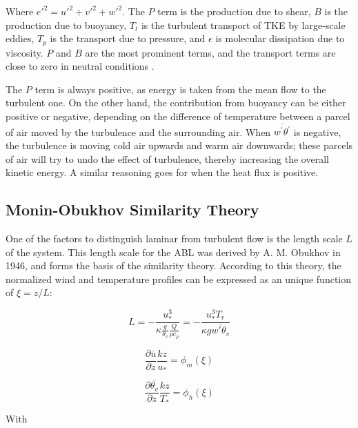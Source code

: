 \documentclass[12pt]{book}
\begin{document}
Where ${e'}^2={u'}^2+{v'}^2+{w'}^2$. The $P$ term is the production due to shear, $B$ is the production due to buoyancy, $T_t$ is the turbulent transport of TKE by large-scale eddies, $T_p$ is the transport due to pressure, and $\epsilon$ is molecular dissipation due to viscosity. $P$ and $B$ are the most prominent terms, and the transport terms are close to zero in neutral conditions \citep{basicatm}.

The $P$ term is always positive, as energy is taken from the mean flow to the turbulent one. On the other hand, the contribution from buoyancy can be either positive or negative, depending on the difference of temperature between a parcel of air moved by the turbulence and the surrounding air. When $\overline{w^\prime\theta^\prime}$ is negative, the turbulence is moving cold air upwards and warm air downwards; these parcels of air will try to undo the effect of turbulence, thereby increasing the overall kinetic energy. A similar reasoning goes for when the heat flux is positive.

\subsection{Monin-Obukhov Similarity Theory}
\label{sec:most}
One of the factors to distinguish laminar from turbulent flow is the length scale $L$ of the system. This length scale for the ABL was derived by A. M. Obukhov in 1946, and forms the basis of the similarity theory. According to this theory, the normalized wind and temperature profiles can be expressed as an unique function of $\xi=z/L$:

\begin{equation}
\label{eq:most_l}
L=-\frac{u_*^3}{\kappa\frac{g}{\theta_v}\frac{Q}{\rho c_\rho}}
=-\frac{u_*^3 T_v}{\kappa g \overline{w'\theta_v}}
\end{equation}

\begin{equation}
\label{eq:phi_m}
\frac{\partial\overline{u}}{\partial z}\frac{kz}{u_*}=\phi_m(\xi)
\end{equation}

\begin{equation}
\label{eq:phi_h}
\frac{\partial\overline{\theta_v}}{\partial z}\frac{kz}{T_*}=\phi_h(\xi)
\end{equation}

With
\end{document}
